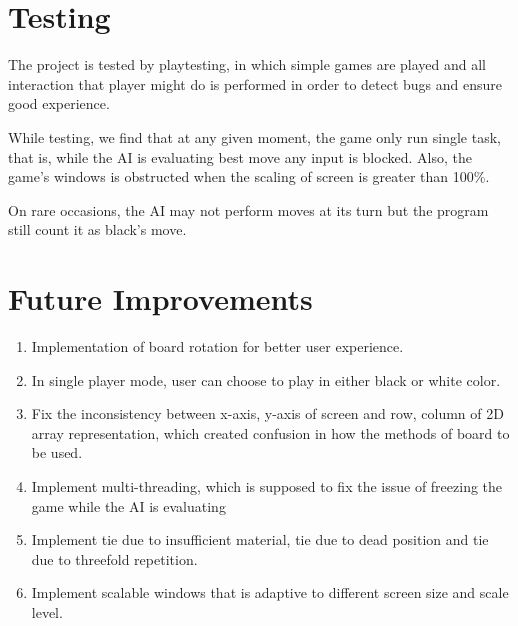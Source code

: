 \documentclass[a4paper, 10pt, titlepage]{report}
\begin{document}
\chapter{Testing}

The project is tested by playtesting, in which simple games are played and all interaction that player might do is performed in order to detect bugs and ensure good experience.

While testing, we find that at any given moment, the game only run single task, that is, while the AI is evaluating best move any input is blocked. Also, the game's windows is obstructed when the scaling of screen is greater than 100\%.

On rare occasions, the AI may not perform moves at its turn but the program still count it as black's move. 
\chapter{Future Improvements}
\begin{enumerate}
  \item Implementation of board rotation for better user experience.
  \item In single player mode, user can choose to play in either black or white color.
  \item Fix the inconsistency between x-axis, y-axis of screen and row, column of 2D array representation, which created confusion in how the methods of board to be used. 
  \item Implement multi-threading, which is supposed to fix the issue of freezing the game while the AI is evaluating
  \item Implement tie due to insufficient material, tie due to dead position and tie due to threefold repetition. 
  \item Implement scalable windows that is adaptive to different screen size and scale level.
\end{enumerate}
\end{document}
